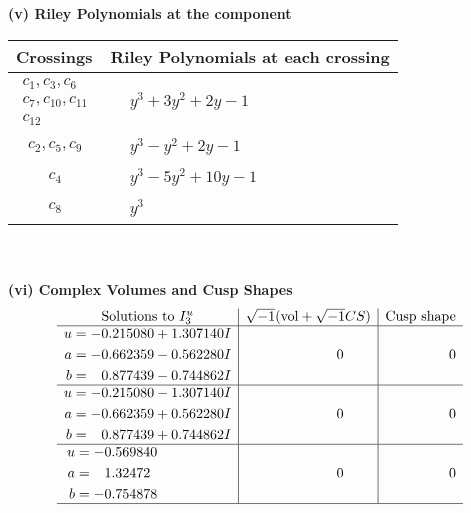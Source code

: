 \documentclass[1p]{elsarticle_modified}
\theoremstyle{definition}
\newcommand{\I}{\sqrt{-1}}
\begin{document}
\newpage\renewcommand{\arraystretch}{1}
\flushleft \textbf{(v) Riley Polynomials at the component}\newline \\
\begin{tabular}{m{50pt}|m{274pt}}
Crossings & \hspace{64pt}Riley Polynomials at each crossing \\
\hline $$\begin{aligned}c_{1},c_{3},c_{6}\\c_{7},c_{10},c_{11}\\c_{12}\end{aligned}$$&$\begin{aligned}
&y^3+3 y^2+2 y-1
\end{aligned}$\\
\hline $$\begin{aligned}c_{2},c_{5},c_{9}\end{aligned}$$&$\begin{aligned}
&y^3- y^2+2 y-1
\end{aligned}$\\
\hline $$\begin{aligned}c_{4}\end{aligned}$$&$\begin{aligned}
&y^3-5 y^2+10 y-1
\end{aligned}$\\
\hline $$\begin{aligned}c_{8}\end{aligned}$$&$\begin{aligned}
&y^3
\end{aligned}$\\
\hline
\end{tabular}\\~\\
\newpage\flushleft \textbf{(vi) Complex Volumes and Cusp Shapes}
$$\begin{array}{c|c|c}  
\text{Solutions to }I^u_{3}& \I (\text{vol} + \sqrt{-1}CS) & \text{Cusp shape}\\
 \hline 
\begin{aligned}
u &= -0.215080 + 1.307140 I \\
a &= -0.662359 - 0.562280 I \\
b &= \phantom{-}0.877439 - 0.744862 I\end{aligned}
 & \phantom{-0.000000 } 0 & \phantom{-0.000000 } 0 \\ \hline\begin{aligned}
u &= -0.215080 - 1.307140 I \\
a &= -0.662359 + 0.562280 I \\
b &= \phantom{-}0.877439 + 0.744862 I\end{aligned}
 & \phantom{-0.000000 } 0 & \phantom{-0.000000 } 0 \\ \hline\begin{aligned}
u &= -0.569840\phantom{ +0.000000I} \\
a &= \phantom{-}1.32472\phantom{ +0.000000I} \\
b &= -0.754878\phantom{ +0.000000I}\end{aligned}
 & \phantom{-0.000000 } 0 & \phantom{-0.000000 } 0\\
 \hline 
 \end{array}$$\newpage
\end{document}
